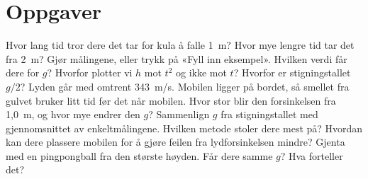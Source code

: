 \documentclass[11pt]{article}
\begin{document}
\section*{Oppgaver}

\begin{oppgaveliste}
\oppgave {}Hvor lang tid tror dere det tar for kula å falle 1~m? Hvor mye lengre tid tar det fra 2~m?
\svar
\oppgave {}Gjør målingene, eller trykk på «Fyll inn eksempel». Hvilken verdi får dere for $g$?
\svar
\oppgave {}Hvorfor plotter vi $h$ mot $t^{2}$ og ikke mot $t$? Hvorfor er stigningstallet $g/2$?
\svar
\oppgave {}Lyden går med omtrent 343~m/s. Mobilen ligger på bordet, så smellet fra gulvet bruker litt tid før det når mobilen. Hvor stor blir den forsinkelsen fra 1,0~m, og hvor mye endrer den $g$?
\svar
\oppgave {}Sammenlign $g$ fra stigningstallet med gjennomsnittet av enkeltmålingene. Hvilken metode stoler dere mest på? Hvordan kan dere plassere mobilen for å gjøre feilen fra lydforsinkelsen mindre?
\svar
\oppgave {}Gjenta med en pingpongball fra den største høyden. Får dere samme $g$? Hva forteller det?
\svar
\end{oppgaveliste}
\end{document}
